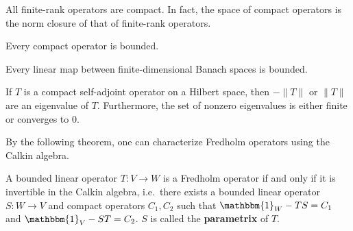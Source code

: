     \begin{property}
        All finite-rank operators are compact. In fact, the space of compact operators is the norm closure of that of finite-rank operators.
    \end{property}

    \begin{property}
        Every compact operator is bounded.
    \end{property}
    \begin{result}
        Every linear map between finite-dimensional Banach spaces is bounded.
    \end{result}

    \begin{property}
        If $T$ is a compact self-adjoint operator on a Hilbert space, then $-\|T\|$ or $\|T\|$ are an eigenvalue of $T$. Furthermore, the set of nonzero eigenvalues is either finite or converges to 0.
    \end{property}



    By the following theorem, one can characterize Fredholm operators using the Calkin algebra.
    \begin{property}[Atkinson]\label{functional:atkinson}
        A bounded linear operator $T:V\rightarrow W$ is a Fredholm operator if and only if it is invertible in the Calkin algebra, i.e.~there exists a bounded linear operator $S:W\rightarrow V$ and compact operators $C_1,C_2$ such that $\mathbbm{1}_W-TS=C_1$ and $\mathbbm{1}_V-ST=C_2$. $S$ is called the \textbf{parametrix} of $T$.
    \end{property}


